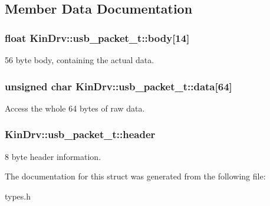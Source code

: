 \subsection{Member Data Documentation}
\hypertarget{structKinDrv_1_1usb__packet__t_aaf50aa504bd699a24581d8a53dbaa52c}{
\subsubsection[{body}]{\setlength{\rightskip}{0pt plus 5cm}float Kin\+Drv\+::usb\+\_\+packet\+\_\+t\+::body\mbox{[}14\mbox{]}}}\label{structKinDrv_1_1usb__packet__t_aaf50aa504bd699a24581d8a53dbaa52c}
56 byte body, containing the actual data. \hypertarget{structKinDrv_1_1usb__packet__t_a1c148e5f7d4aa73edf4dd14446599392}{
\subsubsection[{data}]{\setlength{\rightskip}{0pt plus 5cm}unsigned char Kin\+Drv\+::usb\+\_\+packet\+\_\+t\+::data\mbox{[}64\mbox{]}}}\label{structKinDrv_1_1usb__packet__t_a1c148e5f7d4aa73edf4dd14446599392}
Access the whole 64 bytes of raw data. \hypertarget{structKinDrv_1_1usb__packet__t_a78c5d7c50d214e862212893920c112d7}{
\subsubsection[{header}]{ Kin\+Drv\+::usb\+\_\+packet\+\_\+t\+::header}}\label{structKinDrv_1_1usb__packet__t_a78c5d7c50d214e862212893920c112d7}
8 byte header information. 

The documentation for this struct was generated from the following file\+:\begin{DoxyCompactItemize}
\item 
types.\+h\end{DoxyCompactItemize}
